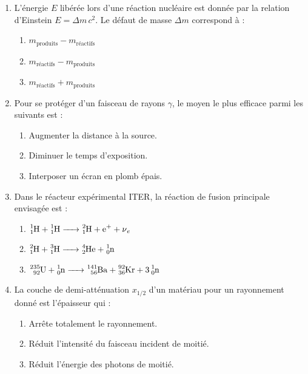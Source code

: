 \documentclass[11pt]{article}
\begin{document}
\begin{exercice}
\begin{enumerate}
    \item L'énergie $E$ libérée lors d'une réaction nucléaire est donnée par la relation d'Einstein $E = \Delta m \, c^2$. Le défaut de masse $\Delta m$ correspond à :
    \begin{enumerate}
        \item $m_{\text{produits}} - m_{\text{réactifs}}$
        \item $m_{\text{réactifs}} - m_{\text{produits}}$
        \item $m_{\text{réactifs}} + m_{\text{produits}}$
    \end{enumerate}
    \item Pour se protéger d'un faisceau de rayons $\gamma$, le moyen le plus efficace parmi les suivants est :
    \begin{enumerate}
        \item Augmenter la distance à la source.
        \item Diminuer le temps d'exposition.
        \item Interposer un écran en plomb épais.
    \end{enumerate}
    \item Dans le réacteur expérimental ITER, la réaction de fusion principale envisagée est :
    \begin{enumerate}
        \item $\ce{^1_1H + ^1_1H -> ^2_1H + e^+ + \nu_e}$
        \item $\ce{^2_1H + ^3_1H -> ^4_2He + ^1_0n}$
        \item $\ce{^235_92U + ^1_0n -> ^141_56Ba + ^92_36Kr + 3 ^1_0n}$
    \end{enumerate}
    \item La couche de demi-atténuation $x_{1/2}$ d'un matériau pour un rayonnement donné est l'épaisseur qui :
    \begin{enumerate}
        \item Arrête totalement le rayonnement.
        \item Réduit l'intensité du faisceau incident de moitié.
        \item Réduit l'énergie des photons de moitié.
    \end{enumerate}
\end{enumerate}
\end{exercice}
\end{document}
